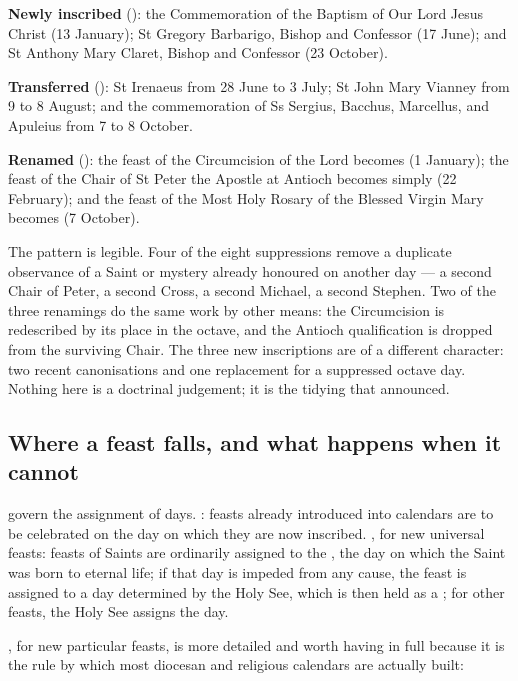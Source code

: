 \textbf{Newly inscribed} (): the Commemoration of the Baptism of Our Lord Jesus Christ
(13 January); St Gregory Barbarigo, Bishop and Confessor (17 June); and St Anthony Mary Claret,
Bishop and Confessor (23 October).

\textbf{Transferred} (): St Irenaeus from 28 June to 3 July; St John Mary Vianney
from 9 to 8 August; and the commemoration of Ss Sergius, Bacchus, Marcellus, and Apuleius from 7
to 8 October.

\textbf{Renamed} (): the feast of the Circumcision of the Lord becomes  (1 January); the feast of the Chair of St Peter the Apostle at Antioch
becomes simply  (22 February); and the feast of the Most
Holy Rosary of the Blessed Virgin Mary becomes 
(7 October).

The pattern is legible. Four of the eight suppressions remove a duplicate observance of a Saint
or mystery already honoured on another day — a second Chair of Peter, a second Cross, a second
Michael, a second Stephen. Two of the three renamings do the same work by other means: the
Circumcision is redescribed by its place in the octave, and the Antioch qualification is dropped
from the surviving Chair. The three new inscriptions are of a different character: two recent
canonisations and one replacement for a suppressed octave day. Nothing here is a doctrinal
judgement; it is the tidying that  announced.

\subsection{Where a feast falls, and what happens when it cannot}

 govern the assignment of days. : feasts already introduced into calendars
are to be celebrated on the day on which they are now inscribed. , for new universal
feasts: feasts of Saints are ordinarily assigned to the , the day on which
the Saint was born to eternal life; if that day is impeded from any cause, the feast is assigned
to a day determined by the Holy See, which is then held as a ; for
other feasts, the Holy See assigns the day.

, for new particular feasts, is more detailed and worth having in full because it is the
rule by which most diocesan and religious calendars are actually built:


